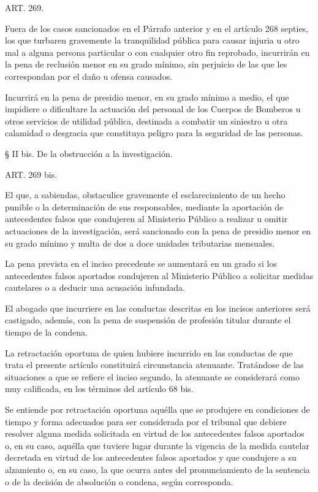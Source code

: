     ART. 269.

    Fuera de los casos sancionados en el Párrafo anterior y en el artículo 268 septies, los que turbaren gravemente la tranquilidad pública para causar injuria u otro mal a alguna persona particular o con cualquier otro fin reprobado, incurrirán en la pena de reclusión menor en su grado mínimo, sin perjuicio de las que les correspondan por el daño u ofensa causados.

    Incurrirá en la pena de presidio menor, en su grado mínimo a medio, el que impidiere o dificultare la actuación del personal de los Cuerpos de Bomberos u otros servicios de utilidad pública, destinada a combatir un siniestro u otra calamidad o desgracia que constituya peligro para la seguridad de las personas.




    § II bis. De la obstrucción a la investigación.




    ART. 269 bis.

    El que, a sabiendas, obstaculice gravemente el esclarecimiento de un hecho punible o la determinación de sus responsables, mediante la aportación de antecedentes falsos que condujeren al Ministerio Público a realizar u omitir actuaciones de la investigación, será sancionado con la pena de presidio menor en su grado mínimo y multa de dos a doce unidades tributarias mensuales.

    La pena prevista en el inciso precedente se aumentará en un grado si los antecedentes falsos aportados condujeren al Ministerio Público a solicitar medidas cautelares o a deducir una acusación infundada.

    El abogado que incurriere en las conductas descritas en los incisos anteriores será castigado, además, con la pena de suspensión de profesión titular durante el tiempo de la condena.

    La retractación oportuna de quien hubiere incurrido en las conductas de que trata el presente artículo constituirá circunstancia atenuante. Tratándose de las situaciones a que se refiere el inciso segundo, la atenuante se considerará como muy calificada, en los términos del artículo 68 bis.

    Se entiende por retractación oportuna aquélla que se produjere en condiciones de tiempo y forma adecuados para ser considerada por el tribunal que debiere resolver alguna medida solicitada en virtud de los antecedentes falsos aportados o, en su caso, aquélla que tuviere lugar durante la vigencia de la medida cautelar decretada en virtud de los antecedentes falsos aportados y que condujere a su alzamiento o, en su caso, la que ocurra antes del pronunciamiento de la sentencia o de la decisión de absolución o condena, según corresponda.

